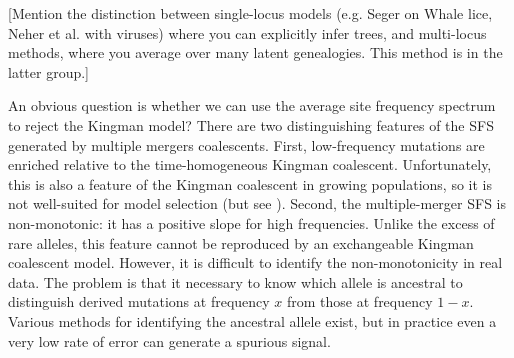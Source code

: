 \documentclass[11pt, letterpaper]{article}   	%
\begin{document}
%
%
%
%
%  

[Mention the distinction between single-locus models (e.g. Seger on Whale lice, Neher et al. with viruses) where you can explicitly infer trees, and multi-locus methods, where you average over many latent genealogies. This method is in the latter group.]

An obvious question is whether we can use the average site frequency spectrum to reject the Kingman model?
There are two distinguishing features of the SFS generated by multiple mergers coalescents.
First, low-frequency mutations are enriched relative to the time-homogeneous Kingman coalescent.
Unfortunately, this is also a feature of the Kingman coalescent in growing populations, so it is not well-suited for model selection (but see \cite{}).
Second, the multiple-merger SFS is non-monotonic: it has a positive slope for high frequencies.
Unlike the excess of rare alleles, this feature cannot be reproduced by an exchangeable Kingman coalescent model.
However, it is difficult to identify the non-monotonicity in real data.
The problem is that it necessary to know which allele is ancestral to distinguish derived mutations at frequency $x$ from those at frequency $1-x$.
Various methods for identifying the ancestral allele exist, but in practice even a very low rate of error can generate a spurious signal.
\end{document}
